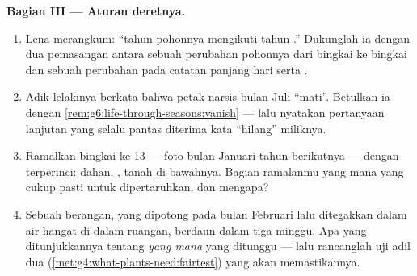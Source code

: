 \begin{problem}
\medskip\noindent\textbf{Bagian III --- Aturan deretnya.}
\begin{enumerate}[resume]
  \item Lena merangkum: ``tahun pohonnya mengikuti tahun .''
        Dukunglah ia dengan dua pemasangan antara sebuah perubahan
        pohonnya dari bingkai ke bingkai dan sebuah perubahan pada
        catatan panjang hari serta .
  \item Adik lelakinya berkata bahwa petak  narsis bulan Juli
        ``mati''. Betulkan ia dengan
        \cref{rem:g6:life-through-seasons:vanish} --- lalu nyatakan
        pertanyaan lanjutan yang selalu pantas diterima kata
        ``hilang'' miliknya.
  \item Ramalkan bingkai ke-13 --- foto bulan Januari tahun berikutnya
        --- dengan terperinci: dahan, , tanah di bawahnya.
        Bagian ramalanmu yang mana yang cukup pasti untuk
        dipertaruhkan, dan mengapa?
  \item Sebuah  berangan, yang dipotong pada bulan Februari lalu
        ditegakkan dalam air hangat di dalam ruangan, berdaun dalam
        tiga minggu. Apa yang ditunjukkannya tentang 
        \emph{yang mana} yang ditunggu  --- lalu rancanglah
        uji adil dua 
        (\cref{met:g4:what-plants-need:fairtest}) yang akan
        memastikannya.
\end{enumerate}
\end{problem}
